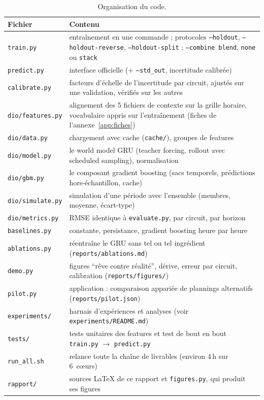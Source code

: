 \documentclass[11pt,a4paper]{article}
\begin{document}
\begin{table}[htbp]
\centering\small
\caption{Organisation du code.}
\label{tab:code}
\begin{tabularx}{\textwidth}{l Y}
\toprule
Fichier & Contenu \\
\midrule
\texttt{train.py} & entraînement en une commande ; protocoles \texttt{--holdout}, \texttt{--holdout-reverse}, \texttt{--holdout-split} ; \texttt{--combine blend}, \texttt{none} ou \texttt{stack} \\
\texttt{predict.py} & interface officielle (+ \texttt{--std\_out}, incertitude calibrée) \\
\texttt{calibrate.py} & facteurs d'échelle de l'incertitude par circuit, ajustés sur une validation, vérifiés sur les autres \\
\texttt{dio/features.py} & alignement des 5 fichiers de contexte sur la grille horaire, vocabulaire appris sur l'entraînement (fiches de l'annexe~\ref{app:fiches}) \\
\texttt{dio/data.py} & chargement avec cache (\texttt{cache/}), groupes de features \\
\texttt{dio/model.py} & le world model GRU (teacher forcing, rollout avec scheduled sampling), normalisation \\
\texttt{dio/gbm.py} & le composant gradient boosting (sacs temporels, prédictions hors-échantillon, cache) \\
\texttt{dio/simulate.py} & simulation d'une période avec l'ensemble (membres, moyenne, écart-type) \\
\texttt{dio/metrics.py} & RMSE identique à \texttt{evaluate.py}, par circuit, par horizon \\
\texttt{baselines.py} & constante, persistance, gradient boosting heure par heure \\
\texttt{ablations.py} & réentraîne le GRU sans tel ou tel ingrédient (\texttt{reports/ablations.md}) \\
\texttt{demo.py} & figures \enquote{rêve contre réalité}, dérive, erreur par circuit, calibration (\texttt{reports/figures/}) \\
\texttt{pilot.py} & application : comparaison appariée de plannings alternatifs (\texttt{reports/pilot.json}) \\
\texttt{experiments/} & harnais d'expériences et analyses (voir \texttt{experiments/README.md}) \\
\texttt{tests/} & tests unitaires des features et test de bout en bout \texttt{train.py} $\rightarrow$ \texttt{predict.py} \\
\texttt{run\_all.sh} & relance toute la chaîne de livrables (environ 4\,h sur 6~cœurs) \\
\texttt{rapport/} & sources LaTeX de ce rapport et \texttt{figures.py}, qui produit ses figures \\
\bottomrule
\end{tabularx}
\end{table}
\end{document}
